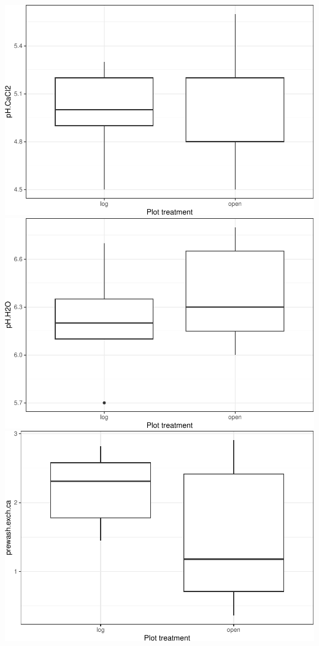 \documentclass[
]{article}
\begin{document}
\includegraphics{log-project-aubrie-winnie_files/figure-latex/unnamed-chunk-8-7.pdf}
\includegraphics{log-project-aubrie-winnie_files/figure-latex/unnamed-chunk-8-8.pdf}
\includegraphics{log-project-aubrie-winnie_files/figure-latex/unnamed-chunk-8-9.pdf}
\end{document}
